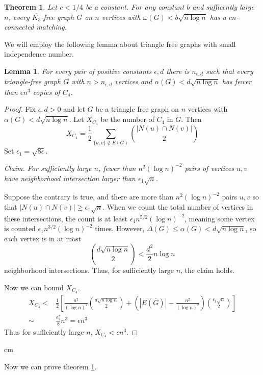 \documentclass[12pt]{article}
\newtheorem{lem}{Lemma}
\newtheorem{theorem}{Theorem}
\theoremstyle{definition}
\begin{document}
\begin{theorem}
Let $c < 1/4$ be a constant.  For any constant $b$ and sufficently large $n$, every $\overline{K_3}$-free graph $G$ on $n$ vertices with $\omega(G) < b\sqrt{n\log n}$ has a $cn$-connected matching.
\label{sm_cli}
\end{theorem}

We will employ the following lemma about triangle free graphs with small independence number.

\begin{lem}
For every pair of positive constants $\epsilon, d$ there is $n_{\epsilon, d}$ such that every triangle-free graph $G$ with $n > n_{\epsilon, d}$ vertices and $\alpha(G) < d\sqrt{n\log n}$ has fewer than $\epsilon n^3$ copies of $C_4$.
\end{lem}
\begin{proof}
Fix $\epsilon, d> 0$ and let $G$ be a triangle free graph on $n$ vertices with $\alpha(G) < d\sqrt{n\log n}$.  Let $X_{C_4}$ be the number of $C_4$ in $G$.  Then
\[X_{C_4} = \frac{1}{2}\sum_{\{u,v\}\notin E(G)} {|N(u) \cap N(v)| \choose 2}\]
Set $\epsilon_1 = \sqrt{8\epsilon}$.

\noindent\textit{Claim. For sufficiently large $n$, fewer than $n^2(\log n)^{-2}$ pairs of vertices $u,v$ have neighborhood intersection larger than $\epsilon_1\sqrt{n}$.}

Suppose the contrary is true, and there are more than $n^2(\log n)^{-2}$ pairs $u,v$ so that $|N(u)\cap N(v)| \geq \epsilon_1\sqrt{n}$. When we count the total number of vertices in these intersections, the count is at least $\epsilon_1n^{5/2}(\log n)^{-2}$, meaning some vertex is counted $\epsilon_1n^{3/2}(\log n)^{-2}$ times.  However, $\Delta(G) \leq \alpha(G) < d\sqrt{n\log n}$, so each vertex is in at most \[{d\sqrt{n\log n}\choose 2 } < \frac{d^2}{2}n\log n\] neighborhood intersections.  Thus, for sufficiently large $n$,  the claim holds.

Now we can bound $X_{C_4}$.
\begin{eqnarray}X_{C_4} <& \frac{1}{2}\left[\frac{n^2}{(\log n)^2}{d\sqrt{n\log n}\choose 2}+ \left(|E(\overline{G})|- \frac{n^2}{(\log n)^2}\right){\epsilon_1\sqrt{n}\choose 2}\right]\\
\sim& \frac{\epsilon_1^2}{8}n^3 = \epsilon n^3
\end{eqnarray}
Thus for sufficiently large $n$, $X_{C_4} < \epsilon n^3$.
\end{proof}
 cm
 
Now we can prove theorem \ref{sm_cli}.
\end{document}
